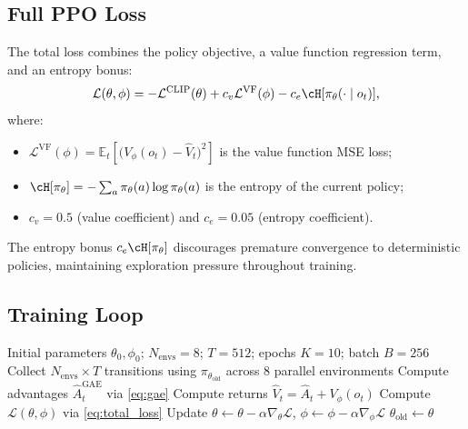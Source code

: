 \documentclass[11pt,a4paper]{article}
\newcommand{\E}{\mathbb{E}}
\newcommand{\cL}{\mathcal{L}}
\newcommand{\policy}{\pi}
\begin{document}
\subsection{Full PPO Loss}

The total loss combines the policy objective,
a value function regression term, and an entropy bonus:
\begin{equation}
  \cL(\theta, \phi)
  = -\cL^{\text{CLIP}}(\theta)
  + c_v \cL^{\text{VF}}(\phi)
  - c_e \cH[\policy_\theta(\cdot \mid o_t)],
  \label{eq:total_loss}
\end{equation}
where:
\begin{itemize}
  \item $\cL^{\text{VF}}(\phi) = \E_t\left[\bigl(V_\phi(o_t) - \hat{V}_t\bigr)^2\right]$
        is the value function MSE loss;
  \item $\cH[\policy_\theta] = -\sum_a \policy_\theta(a)\log\policy_\theta(a)$
        is the entropy of the current policy;
  \item $c_v = 0.5$ (value coefficient) and $c_e = 0.05$ (entropy coefficient).
\end{itemize}
The entropy bonus $c_e \cH[\policy_\theta]$ discourages premature convergence
to deterministic policies, maintaining exploration pressure throughout training.

\subsection{Training Loop}

\begin{algorithm}[H]
\caption{PPO with Frame-Stacking (Phase 1)}
\label{alg:ppo}
\begin{algorithmic}[1]
\Require Initial parameters $\theta_0, \phi_0$; $N_{\text{envs}}=8$; $T=512$; epochs $K=10$; batch $B=256$
  \State Collect $N_{\text{envs}} \times T$ transitions using $\policy_{\theta_{\text{old}}}$
         across 8 parallel environments
  \State Compute advantages $\hat{A}_t^{\text{GAE}}$ via \eqref{eq:gae}
  \State Compute returns $\hat{V}_t = \hat{A}_t + V_\phi(o_t)$
      \State Compute $\cL(\theta, \phi)$ via \eqref{eq:total_loss}
      \State Update $\theta \leftarrow \theta - \alpha \nabla_\theta \cL$,
             $\phi \leftarrow \phi - \alpha \nabla_\phi \cL$
    \EndFor
  \EndFor
  \State $\theta_{\text{old}} \leftarrow \theta$
\EndFor
\end{algorithmic}
\end{algorithm}
\end{document}
